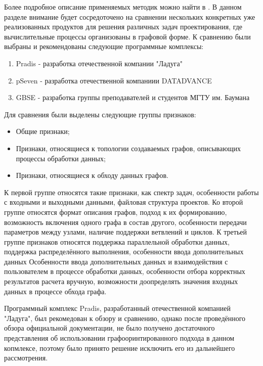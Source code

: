 Более подробное описание применяемых методик можно найти в \cite{SokolovGolubev2021}. В данном разделе внимание будет сосредоточено на сравнении нескольких конкретных уже реализованных продуктов для решения различных задач проектирования, где вычислительные процессы организованы в графовой форме.
К сравнению были выбраны и рекомендованы следующие программные комплексы:
\begin{enumerate}
    \item Pradis - разработка отечественной компании "Ладуга"
    \item pSeven - разработка отечественной компаниии DATADVANCE
    \item GBSE - разработка группы преподавателей и студентов МГТУ им. Баумана
\end{enumerate}
Для сравнения были выделены следующие группы признаков:
\begin{itemize}
    \item Общие признаки;
    \item Признаки, относящиеся к топологии создаваемых графов, описывающих процессы обработки данных;
    \item Признаки, относящиеся к обходу данных графов.
\end{itemize}
К первой группе относятся такие признаки, как спектр задач, особенности работы с входными и выходными данными, файловая структура проектов. Ко второй группе относятся формат описания графов, подход к их формированию, возможность включения одного графа в состав другого, особенности передачи параметров между узлами, наличие поддержки ветвлений и циклов. К третьей группе признаков относятся поддержка параллельной обработки данных, поддержка распределённого выполнения, особенности ввода дополнительных данных Особенности ввода дополнительных данных и взаимодействия с пользователем в процессе обработки данных, особенности отбора корректных результатов расчета вручную, возможности доопределять значения входных данных в процессе обхода графа.

Программный комплекс Pradis, разработанный отечественной компанией "Ладуга", был рекомедован к обзору и сравнению, однако после проведённого обзора официальной документации\cite{PradisGeneral2007}\cite{PradisMethods2007}, не было получено достаточного представления об использовании графооринтированного подхода в данном копмлексе, поэтому было принято решение исключить его из дальнейшего рассмотрения.

